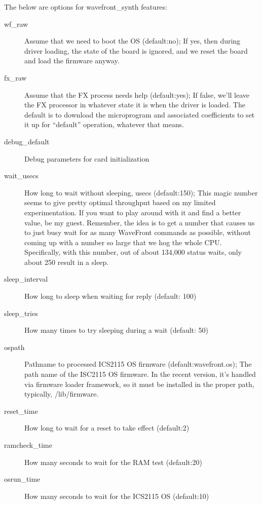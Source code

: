 \documentclass[a4paper,8pt,english]{sphinxmanual}
\begin{document}
The below are options for wavefront\_synth features:
\begin{description}
\item[{wf\_raw}] \leavevmode
Assume that we need to boot the OS (default:no);
If yes, then during driver loading, the state of the board is
ignored, and we reset the board and load the firmware anyway.

\item[{fx\_raw}] \leavevmode
Assume that the FX process needs help (default:yes);
If false, we'll leave the FX processor in whatever state it is
when the driver is loaded.  The default is to download the
microprogram and associated coefficients to set it up for
``default'' operation, whatever that means.

\item[{debug\_default}] \leavevmode
Debug parameters for card initialization

\item[{wait\_usecs}] \leavevmode
How long to wait without sleeping, usecs (default:150);
This magic number seems to give pretty optimal throughput
based on my limited experimentation.
If you want to play around with it and find a better value, be
my guest. Remember, the idea is to get a number that causes us
to just busy wait for as many WaveFront commands as possible,
without coming up with a number so large that we hog the whole
CPU.
Specifically, with this number, out of about 134,000 status
waits, only about 250 result in a sleep.

\item[{sleep\_interval}] \leavevmode
How long to sleep when waiting for reply (default: 100)

\item[{sleep\_tries}] \leavevmode
How many times to try sleeping during a wait (default: 50)

\item[{ospath}] \leavevmode
Pathname to processed ICS2115 OS firmware (default:wavefront.os);
The path name of the ISC2115 OS firmware.  In the recent
version, it's handled via firmware loader framework, so it
must be installed in the proper path, typically,
/lib/firmware.

\item[{reset\_time}] \leavevmode
How long to wait for a reset to take effect (default:2)

\item[{ramcheck\_time}] \leavevmode
How many seconds to wait for the RAM test (default:20)

\item[{osrun\_time}] \leavevmode
How many seconds to wait for the ICS2115 OS (default:10)

\end{description}
\end{document}
